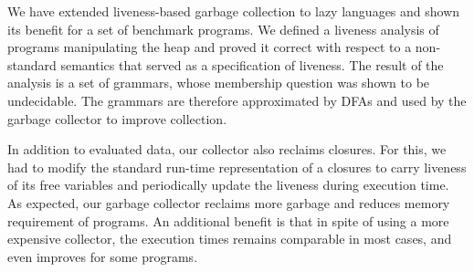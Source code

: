 \documentclass[preprint, 9pt]{sigplanconf}
\begin{document}

We have  extended liveness-based  garbage collection  to lazy
  languages  and shown  its benefit  for a  set of  benchmark
  programs.  We  defined a liveness analysis  of programs manipulating
  the  heap and  proved  it  correct with  respect  to a  non-standard
  semantics that served as a specification of liveness.  The result of
  the analysis  is a  set of grammars,  whose membership  question was
  shown to be undecidable. The  grammars are therefore approximated by
  DFAs and used by the garbage collector to improve collection.

In addition to  evaluated data, our collector  also reclaims closures.
For this, we  had to modify the standard run-time  representation of a
closures  to carry  liveness  of its free  variables and  periodically
update the liveness during execution  time.  As expected, our garbage
collector  reclaims more  garbage and  reduces memory  requirement of
programs.  An  additional benefit is  that in  spite of using  a more
expensive collector, the execution times remains comparable in
most cases, and even improves for some programs.
\end{document}
